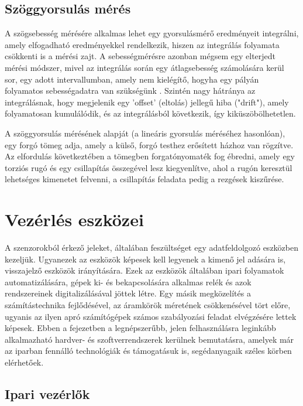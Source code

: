 \subsection{Szöggyorsulás mérés}

A szögsebesség mérésére alkalmas lehet egy gyorsulásmérő eredményeit integrálni, amely elfogadható eredményekkel rendelkezik, hiszen az integrálás folyamata csökkenti is a mérési zajt. A sebességmérésre azonban mégsem egy elterjedt mérési módszer, mivel az integrálás során egy átlagsebesség számolására kerül sor, egy adott intervallumban, amely nem kielégítő, hogyha egy pályán folyamatos sebességadatra van szükségünk \cite{Morris2016b}. Szintén nagy hátránya az integrálásnak, hogy megjelenik egy 'offset' (eltolás) jellegű hiba ("drift"), amely folyamatosan kumulálódik, és az integrálásból következik, így kiküszöbölhetetlen.

A szöggyorsulás mérésének alapját (a lineáris gyorsulás méréséhez hasonlóan), egy forgó tömeg adja, amely a külső, forgó testhez erősített házhoz van rögzítve. Az elfordulás következtében a tömegben forgatónyomaték fog ébredni, amely egy torziós rugó és egy csillapítás összegével lesz kiegyenlítve, ahol a rugón keresztül lehetséges kimenetet felvenni, a csillapítás feladata pedig a rezgések kiszűrése. 

\section{Vezérlés eszközei}

A szenzorokból érkező jeleket, általában feszültséget egy adatfeldolgozó eszközben kezeljük. Ugyanezek az eszközök képesek kell legyenek a kimenő jel adására is, visszajelző eszközök irányítására. Ezek az eszközök általában ipari folyamatok automatizálására, gépek ki- és bekapcsolására alkalmas relék és azok rendszereinek digitalizálásával jöttek létre. Egy másik megközelítés a számítástechnika fejlődésével, az áramkörök méretének csökkenésével tört előre, ugyanis az ilyen apró számítógépek számos szabályozási feladat elvégzésére lettek képesek. Ebben a fejezetben a legnépszerűbb, jelen felhasználásra leginkább alkalmazható hardver- és szoftverrendszerek kerülnek bemutatásra, amelyek már az iparban fennálló technológiák és támogatásuk is, segédanyagaik széles körben elérhetőek.

\subsection{Ipari vezérlők}

